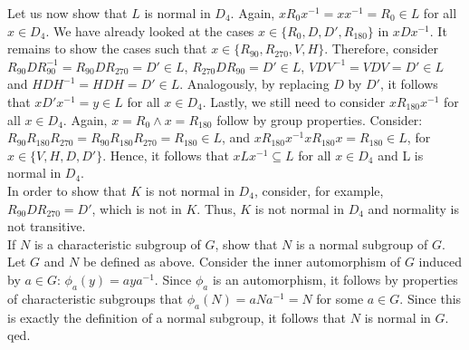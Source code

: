 \documentclass{article}
\newcommand{\and}{\wedge}
\begin{document}
Let us now show that $L$ is normal in $D_4$. Again, $xR_0x^{-1}=xx^{-1}=R_0 \in L$ for all $x \in D_4$. We have already looked at the cases $x \in \{R_0, D, D', R_{180}\}$ in $xDx^{-1}$. It remains to show the cases such that $x \in \{R_{90}, R_{270}, V, H\}$. Therefore, consider $R_{90}DR_{90}^{-1}=R_{90}DR_{270}=D' \in L$, $R_{270}DR_{90}=D' \in L$, $VDV^{-1}=VDV=D' \in L$ and $HDH^{-1}=HDH=D' \in L$. Analogously, by replacing $D$ by $D'$, it follows that $xD'x^{-1}=y \in L$ for all $x \in D_4$. Lastly, we still need to consider $xR_{180}x^{-1}$ for all $x \in D_4$. Again, $x=R_0 \and x=R_{180}$ follow by group properties. Consider:  $R_{90}R_{180}R_{270}=R_{90}R_{180}R_{270}=R_{180} \in L$, and $xR_{180}x^{-1}xR_{180}x=R_{180} \in L$, for $x \in \{V, H, D, D'\}$. Hence, it follows that $xLx^{-1} \subseteq L$ for all $x \in D_4$ and L is normal in $D_4$. \\

In order to show that $K$ is not normal in $D_4$, consider, for example, $R_{90}DR_{270}=D'$, which is not in $K$. Thus, $K$ is not normal in $D_4$ and normality is not transitive.\\

 If $N$ is a characteristic subgroup of $G$, show that $N$ is a normal subgroup of $G$. \\

 Let $G$ and $N$ be defined as above. Consider the inner automorphism of $G$ induced by $a \in G$: $\phi_a(y)=aya^{-1}$. Since $\phi_a$ is an automorphism, it follows by properties of characteristic subgroups that $\phi_a(N)=aNa^{-1}=N$ for some $a \in G$. Since this is exactly the definition of a normal subgroup, it follows that $N$ is normal in $G$. qed. \\
\end{document}
